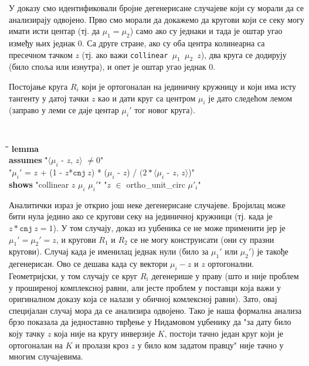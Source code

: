 У доказу смо идентификовали бројне дегенерисане случајеве који су
морали да се анализирају одвојено. Прво смо морали да докажемо да
кругови који се секу могу имати исти центар (тј. да
$\mu_1$$=$$\mu_2$) само ако су једнаки и тада је оштар угао између
њих једнак $0$. Са друге стране, ако су оба центра колинеарна са
пресечном тачком $z$ (тј. ако важи {\tt collinear $\mu_1$ $\mu_2$
  $z$}), два круга се додирују (било споља или изнутра), и опет је
оштар угао једнак $0$.

Постојање круга $R_i$ који је ортогоналан на јединичну кружницу и који
има исту тангенту у датој тачки $z$ као и дати круг са центром $\mu_i$
је дато следећом лемом (заправо у леми се даје центар $\mu_i'$ тог
новог круга).  
{\tt
  \begin{tabbing}
    \hspace{5mm}\=\hspace{5mm}\=\hspace{5mm}\=\hspace{5mm}\=\hspace{5mm}\=\kill
\textbf{lemma} \\
\> \textbf{assumes} \="$\langle$$\mu_i$ - $z$, $z$$\rangle$ $\neq 0$"\\
\>\> "$\mu_i'$ = $z$ + (1 - $z$*$\mathtt{cnj}\ z$) * ($\mu_i$ - $z$) / $(2 * \langle$$\mu_i$ - $z$, $z$$\rangle$)"\\
  \> \textbf{shows} "collinear $z$ $\mu_i$ $\mu_i'$" "$z$ $\in$ ortho\_unit\_circ $\mu'_i$" \\
  \end{tabbing}
}
\noindent Аналитички израз је открио још неке дегенерисане
случајеве. Бројилац може бити нула једино ако се кругови секу на
јединичној кружници (тј. када је $z*\mathtt{cnj}\ z = 1$). У том
случају, доказ из уџбеника се не може применити јер је $\mu_1' =
\mu_2' = z$, и кругови $R_1$ и $R_2$ се не могу конструисати (они су
празни кругови). Случај када је именилац једнак нули (било за $\mu_1'$
или $\mu_2'$) је такође дегенерисан. Ово се дешава када су вектори
$\mu_i - z$ и $z$ ортогонални. Геометријски, у том случају се круг
$R_i$ дегенерише у праву (што и није проблем у проширеној комплексној
равни, али јесте проблем у поставци која важи у оригиналном доказу
која се налази у обичној комлексној равни). Зато, овај специјалан
случај мора да се анализира одвојено. Тако је наша формална анализа
брзо показала да једноставно тврђење у Нидамовом уџбенику
\cite{needham} да "за дату било коју тачку $z$ која није на кругу
инверзије $K$, постоји тачно један круг који је ортогоналан на $K$ и
пролази кроз $z$ у било ком задатом правцу" није тачно у многим
случајевима.


